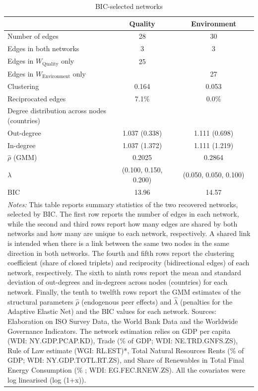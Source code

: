 \begin{table}[H]\centering
\caption{BIC-selected networks}\label{tab:network_eu}
\begin{tabular}{lcc}\hline\hline
& Quality & Environment \\\hline
Number of edges & 28 & 30 \\
Edges in both networks & 3 & 3 \\
Edges in $W_{\text{Quality}}$ only & 25 & \\
Edges in $W_{\text{Environment}}$ only & & 27 \\
Clustering & 0.164 & 0.053 \\
Reciprocated edges & 7.1\% & 0.0\% \\
Degree distribution across nodes (countries) & & \\
\quad Out-degree & 1.037 (0.338) & 1.111 (0.698) \\
\quad In-degree & 1.037 (1.372) & 1.111 (1.219) \\
\hline
$\hat{\rho}$ (GMM) & 0.2025 & 0.2864 \\
$\lambda$ & (0.100, 0.150, 0.200) & (0.050, 0.050, 0.100) \\
BIC & 13.96 & 14.57 \\
\hline\hline
\multicolumn{3}{p{0.95\textwidth}}{\footnotesize \textit{Notes:} This table reports summary statistics of the two recovered networks, selected by BIC. The first row reports the number of edges in each network, while the second and third rows report how many edges are shared by both networks and how many are unique to each network, respectively. A shared link is intended when there is a link between the same two nodes in the same direction in both networks. The fourth and fifth rows report the clustering coefficient (share of closed triplets) and reciprocity (bidirectional edges) of each network, respectively. The sixth to ninth rows report the mean and standard deviation of out-degrees and in-degrees across nodes (countries) for each network. Finally, the tenth to twelfth rows report the GMM estimates of the structural parameters $\hat{\rho}$ (endogenous peer effects) and $\hat{\lambda}$ (penalties for the Adaptive Elastic Net) and the BIC values for each network. Sources: Elaboration on ISO Survey Data, the World Bank Data and the Worldwide Governance Indicators. The network estimation relies on GDP per capita (WDI: NY.GDP.PCAP.KD), Trade (\% of GDP; WDI: NE.TRD.GNFS.ZS), Rule of Law estimate (WGI: RL.EST)*, Total Natural Resources Rents (\% of GDP; WDI: NY.GDP.TOTL.RT.ZS), and Share of Renewables in Total Final Energy Consumption (\% ; WDI: EG.FEC.RNEW.ZS). All the covariates were log linearised (log (1+x)).} \\
\end{tabular}\end{table}

